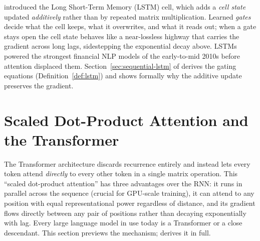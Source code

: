 \begin{deepdive}
\citet{hochreiter1997long}
introduced the Long Short-Term Memory (LSTM) cell, which adds a
\emph{cell state} updated \emph{additively} rather than by repeated matrix
multiplication.  Learned \emph{gates} decide what the cell keeps, what it
overwrites, and what it reads out; when a gate stays open the cell state
behaves like a near-lossless highway that carries the gradient across long
lags, sidestepping the exponential decay above.  LSTMs powered the
strongest financial NLP models of the early-to-mid 2010s before attention
displaced them.  Section~\ref{sec:sequential-lstm} of
 derives the gating equations
(Definition~\ref{def:lstm}) and shows formally why the additive update
preserves the gradient.

\end{deepdive}

\section{Scaled Dot-Product Attention and the Transformer}
\label{sec:attention}

\begin{context}
The Transformer architecture \cite{vaswani2017attention}
discards recurrence entirely and instead lets every token attend
\emph{directly} to every other token in a single matrix operation.
This ``scaled dot-product attention'' has three advantages over the RNN:
it runs in parallel across the sequence (crucial for GPU-scale training),
it can attend to any position with equal representational power regardless
of distance, and its gradient flows directly between any pair of positions
rather than decaying exponentially with lag.  Every large language model in
use today is a Transformer or a close descendant.  This section previews
the mechanism;  derives it in full.
\end{context}

